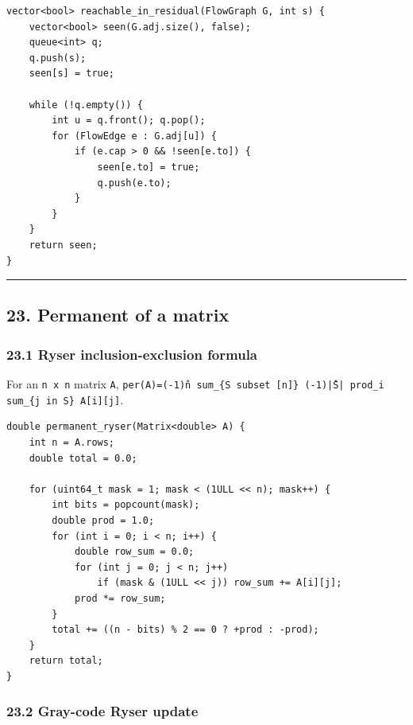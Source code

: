\documentclass[11pt]{article}
\begin{document}
\begin{verbatim}
vector<bool> reachable_in_residual(FlowGraph G, int s) {
    vector<bool> seen(G.adj.size(), false);
    queue<int> q;
    q.push(s);
    seen[s] = true;

    while (!q.empty()) {
        int u = q.front(); q.pop();
        for (FlowEdge e : G.adj[u]) {
            if (e.cap > 0 && !seen[e.to]) {
                seen[e.to] = true;
                q.push(e.to);
            }
        }
    }
    return seen;
}
\end{verbatim}

\begin{center}\rule{0.5\linewidth}{0.5pt}\end{center}

\subsection{23. Permanent of a matrix}\label{permanent-of-a-matrix}

\subsubsection{23.1 Ryser inclusion-exclusion formula}\label{ryser-inclusion-exclusion-formula}

For an \texttt{n x n} matrix \texttt{A}, \texttt{per(A)=(-1)\^n sum\_\{S subset [n]\} (-1)\^|S| prod\_i sum\_\{j in S\} A[i][j]}.

\begin{verbatim}
double permanent_ryser(Matrix<double> A) {
    int n = A.rows;
    double total = 0.0;

    for (uint64_t mask = 1; mask < (1ULL << n); mask++) {
        int bits = popcount(mask);
        double prod = 1.0;
        for (int i = 0; i < n; i++) {
            double row_sum = 0.0;
            for (int j = 0; j < n; j++)
                if (mask & (1ULL << j)) row_sum += A[i][j];
            prod *= row_sum;
        }
        total += ((n - bits) % 2 == 0 ? +prod : -prod);
    }
    return total;
}
\end{verbatim}

\subsubsection{23.2 Gray-code Ryser update}\label{gray-code-ryser-update}
\end{document}
